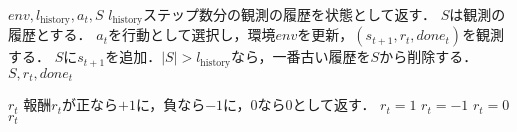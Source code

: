 \documentclass{jarticle}
\begin{document}
\begin{algorithm}[tb]
\caption{$step_{\mathrm{stack}}(a_t)$}
\label{alg:frame_stack}                          
\begin{algorithmic}[1]   
\REQUIRE $env, l_{\mathrm{history}}, a_t, S$
\STATE $l_{\mathrm{history}}$ステップ数分の観測の履歴を状態として返す．
\STATE $S$は観測の履歴とする．
\STATE $a_t$を行動として選択し，環境$env$を更新，$(s_{t+1},r_t, done_t)$を観測する．
\STATE $S$に$s_{t+1}$を追加．$|S|>l_{\mathrm{history}}$なら，一番古い履歴を$S$から削除する．
\ENSURE $S, r_t, done_t$
\end{algorithmic}
\end{algorithm}

\begin{algorithm}[tb]
\caption{$reward_{\mathrm{clip}}()$}
\label{alg:clipped_reward_wrapper}                          
\begin{algorithmic}[1]   
\REQUIRE $r_t$
\STATE 報酬$r_t$が正なら$+1$に，負なら$-1$に，$0$なら$0$として返す．
\STATE $r_t=1$
\STATE $r_t=-1$
\ELSE
\STATE $r_t=0$
\ENDIF
\ENSURE $r_t$
\end{algorithmic}
\end{algorithm}
\end{document}
